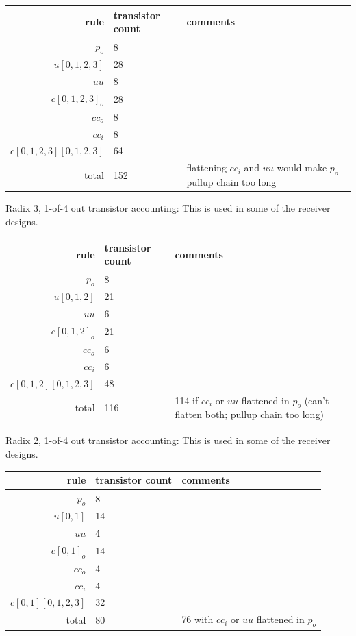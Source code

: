 \documentclass{article}
\begin{document}
\begin{center}
    \begin{tabular}{|r|l|l|}
    \hline
    rule & transistor count & comments \\ \hline
    $p_o$ & 8 & \\ \hline
    $u[0,1,2,3]$ & 28 & \\ \hline
    $uu$ & 8 & \\ \hline
    $c[0,1,2,3]_o$ & 28 & \\ \hline
    $cc_o$ & 8 & \\ \hline
    $cc_i$ & 8 & \\ \hline
    $c[0,1,2,3][0,1,2,3]$ & 64 & \\ \hline
    \hline total & 152 & flattening $cc_i$ and $uu$ would make $p_o$ pullup chain too long \\ \hline
    \end{tabular}
\end{center}

\noindent
Radix 3, 1-of-4 out transistor accounting: This is used in some of the receiver
designs.

\begin{center}
    \begin{tabular}{|r|l|l|}
    \hline
    rule & transistor count & comments \\ \hline
    $p_o$ & 8 & \\ \hline
    $u[0,1,2]$ & 21 & \\ \hline
    $uu$ & 6 & \\ \hline
    $c[0,1,2]_o$ & 21 & \\ \hline
    $cc_o$ & 6 & \\ \hline
    $cc_i$ & 6 & \\ \hline
    $c[0,1,2][0,1,2,3]$ & 48 & \\ \hline
    \hline total & 116 & 114 if $cc_i$ or $uu$ flattened in $p_o$ (can't flatten both; pullup chain too long) \\ \hline
    \end{tabular}
\end{center}

\noindent
Radix 2, 1-of-4 out transistor accounting: This is used in some of the receiver
designs.

\begin{center}
    \begin{tabular}{|r|l|l|}
    \hline
    rule & transistor count & comments \\ \hline
    $p_o$ & 8 & \\ \hline
    $u[0,1]$ & 14 & \\ \hline
    $uu$ & 4 & \\ \hline
    $c[0,1]_o$ & 14 & \\ \hline
    $cc_o$ & 4 & \\ \hline
    $cc_i$ & 4 & \\ \hline
    $c[0,1][0,1,2,3]$ & 32 & \\ \hline
    \hline total & 80 & 76 with $cc_i$ or $uu$ flattened in $p_o$ \\ \hline
    \end{tabular}
\end{center}
\end{document}
